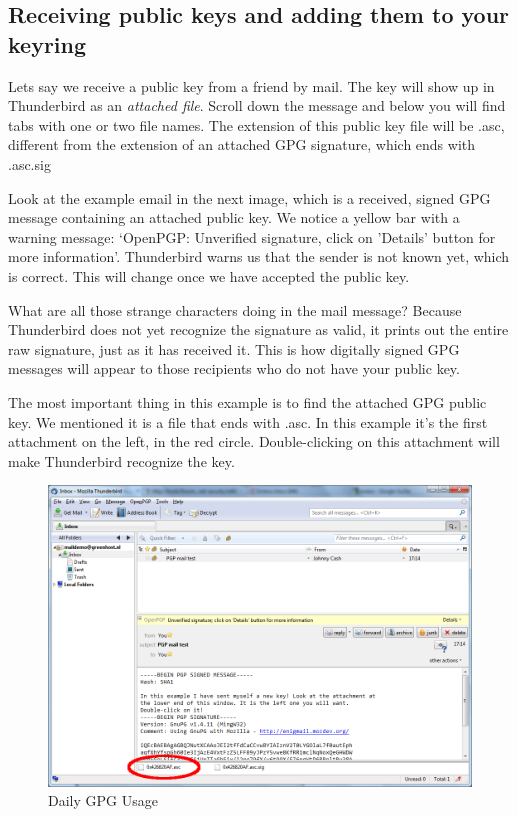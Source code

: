 \subsection{Receiving public keys and adding them to your keyring}

Lets say we receive a public key from a friend by mail. The key will
show up in Thunderbird as an \emph{attached file}. Scroll down the
message and below you will find tabs with one or two file names. The
extension of this public key file will be .asc, different from the
extension of an attached GPG signature, which ends with .asc.sig

Look at the example email in the next image, which is a received, signed
GPG message containing an attached public key. We notice a yellow bar
with a warning message: `OpenPGP: Unverified signature, click on
'Details' button for more information'. Thunderbird warns us that the
sender is not known yet, which is correct. This will change once we have
accepted the public key.

What are all those strange characters doing in the mail message? Because
Thunderbird does not yet recognize the signature as valid, it prints out
the entire raw signature, just as it has received it. This is how
digitally signed GPG messages will appear to those recipients who do not
have your public key.

The most important thing in this example is to find the attached GPG
public key. We mentioned it is a file that ends with .asc. In this
example it's the first attachment on the left, in the red circle.
Double-clicking on this attachment will make Thunderbird recognize the
key.

\begin{figure}[htbp]
\centering
\includegraphics{daily_gpg_4.png}
\caption{Daily GPG Usage}
\end{figure}


